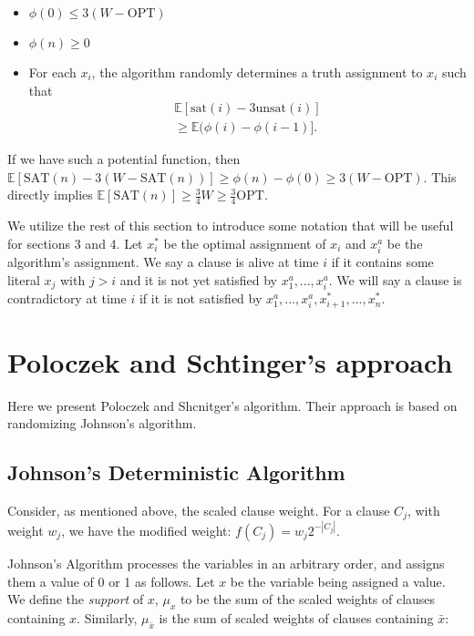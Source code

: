 \documentclass[11pt,letter]{article}
\numberwithin{theorem}{section}
\begin{document}
\begin{itemize}
	\item $\phi(0) \leq 3(W-\textrm{OPT})$
	\item $\phi(n) \geq 0$
	\item For each $x_i$, the algorithm randomly determines a truth assignment to $x_i$ such that
\begin{equation}
\begin{aligned}
\label{eq:2}
\mathbb{E}[\mathrm{sat}(i) - 3\mathrm{unsat}(i)] \\
\geq \mathbb{E}(\phi(i) - \phi(i-1)].
\end{aligned}
\end{equation}
\end{itemize}

If we have such a potential function, then $\mathbb{E}[\textrm{SAT}(n)- 3\left(W-\textrm{SAT}(n)\right)] \geq \phi(n) - \phi(0) \geq 3(W-\textrm{OPT})$.
This directly implies $\mathbb{E}[\textrm{SAT}(n)] \geq \frac{3}{4} W \geq \frac{3}{4} \textrm{OPT}$.

We utilize the rest of this section to introduce some notation that will be useful for sections 3 and 4.
Let $x_i^*$ be the optimal assignment of $x_i$ and $x_i^{a}$ be the algorithm's assignment. We say a clause is alive
at time $i$ if it contains some literal $x_j$ with $j > i$ and it is not yet satisfied by $x_1^a,...,x_i^a$.
We will say a clause is contradictory at time $i$ if it is not satisfied by $x_1^a,...,x_i^a,x_{i+1}^*,...,x_n^*$.


\section{Poloczek and Schtinger's approach}\label{S:PS}

Here we present Poloczek and Shcnitger's algorithm. Their approach is based on randomizing Johnson's algorithm.

\subsection*{Johnson's Deterministic Algorithm}

Consider, as mentioned above, the scaled clause weight. For a clause $C_j$, with weight $w_j$, we have the modified weight:  $f(C_j) = w_j 2^{-|C_j|}$.

Johnson's Algorithm processes the variables in an arbitrary order, and assigns them a value of 0 or 1 as follows. Let $x$ be the variable being assigned a value. We define the \emph{support} of $x$, $\mu_x$ to be the sum of the scaled weights of clauses containing $x$. Similarly, $\mu_{\bar{x}}$ is the sum of scaled weights of clauses containing $\bar{x}$:
\end{document}
